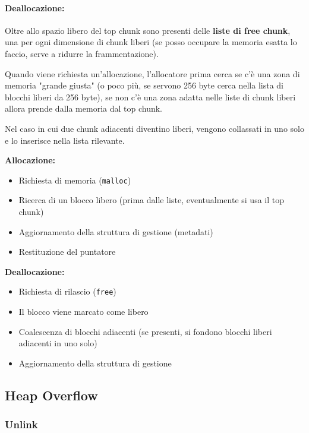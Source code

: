 \paragraph{Deallocazione:} Oltre allo spazio libero del top chunk sono presenti delle \textbf{liste di free chunk}, una per ogni dimensione di chunk liberi (se posso occupare la memoria esatta lo faccio, serve a ridurre la frammentazione). 

Quando viene richiesta un'allocazione, l'allocatore prima cerca se c'è una zona di memoria "grande giusta" (o poco più, se servono 256 byte cerca nella lista di blocchi liberi da 256 byte), se non c'è una zona adatta nelle liste di chunk liberi allora prende dalla memoria dal top chunk.

Nel caso in cui due chunk adiacenti diventino liberi, vengono collassati in uno solo e lo inserisce nella lista rilevante.

\vfill

\begin{minipage}{0.43\textwidth}
	\textbf{Allocazione:}
	\begin{itemize}
		\item Richiesta di memoria (\texttt{malloc})
		\item Ricerca di un blocco libero (prima dalle liste, eventualmente si usa il top chunk)
		\item Aggiornamento della struttura di gestione (metadati)
		\item Restituzione del puntatore
	\end{itemize}
\end{minipage}
\hfill
\begin{minipage}{0.43\textwidth}
	\textbf{Deallocazione:}
	\begin{itemize}
		\item Richiesta di rilascio (\texttt{free})
		\item Il blocco viene marcato come libero 
		\item Coalescenza di blocchi adiacenti (se presenti, si fondono blocchi liberi adiacenti in uno solo)
		\item Aggiornamento della struttura di gestione
	\end{itemize}
\end{minipage}

\subsection{Heap Overflow}

\subsubsection{Unlink}

